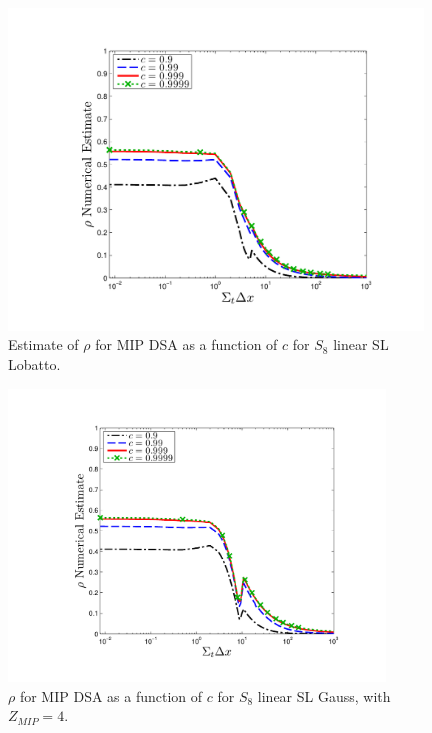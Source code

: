 %
\begin{figure}[!hbp]
\centering
\includegraphics[width=11cm]{chapter4_acceleration/Const_2_Constant_XS_c_comparions_MIP_Lobatto.pdf}
\caption{Estimate of $\rho$ for MIP DSA as a function of $c$  for  $S_8$  linear SL Lobatto.}
\label{fig:mip_lobatto_as_fun_c}
\end{figure}
%

\newpage

\begin{figure}[!htp]
\centering
\includegraphics[width=10cm]{chapter4_acceleration/Const_4_Constant_XS_c_comparions_MIP_Gauss.pdf}
\caption{$\rho$ for MIP DSA as a function of $c$  for  $S_8$  linear SL Gauss, with $Z_{MIP}=4$.}
\label{fig:mip_gauss_as_fun_c_z4}
\end{figure}



